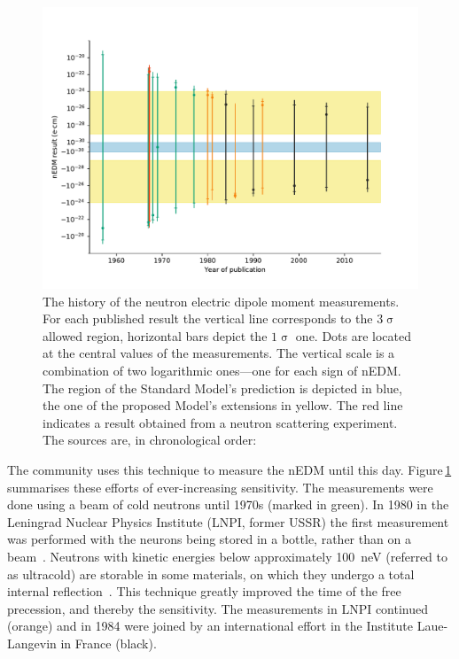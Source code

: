 \begin{figure}
  \centering
  \includegraphics[width=\linewidth]{gfx/introduction/edm_limits.pdf}
  \caption{The history of the neutron electric dipole moment measurements. For each published result the vertical line corresponds to the $3\upsigma$ allowed region, horizontal bars depict the $1\upsigma$ one. Dots are located at the central values of the measurements. The vertical scale is a combination of two logarithmic ones---one for each sign of nEDM. The region of the Standard Model's prediction is depicted in blue, the one of the proposed Model's extensions in yellow. The red line indicates a result obtained from a neutron scattering experiment. The sources are, in chronological order:~\cite{PhysRev.108.120,PhysRevLett.19.381,PhysRevLett.19.384,PhysRev.170.1200,PhysRev.179.1285,PhysRevD.7.3147,PhysRevD.15.9,ALTAREV1980269,ALTAREV198113,altarev1986search,ALTAREV1992242,PENDLEBURY1984327,SMITH1990191,PhysRevLett.82.904,PhysRevLett.97.131801}}
  \label{fig:nEDM_limits_history}
\end{figure}

The community uses this technique to measure the nEDM until this day. Figure\,\ref{fig:nEDM_limits_history} summarises these efforts of ever-increasing sensitivity. The measurements were done using a beam of cold neutrons until 1970s (marked in green).
In 1980 in the Leningrad Nuclear Physics Institute (LNPI, former USSR) the first measurement was performed with the neurons being stored in a bottle, rather than on a beam~\cite{ALTAREV1980269}. Neutrons with kinetic energies below approximately \SI{100}{\nano\electronvolt} (referred to as ultracold) are storable in some materials, on which they undergo a total internal reflection~\cite{UCNbook}. This technique greatly improved the time of the free precession, and thereby the sensitivity. The measurements in LNPI continued (orange) and in 1984 were joined by an international effort in the Institute Laue-Langevin in France (black).

